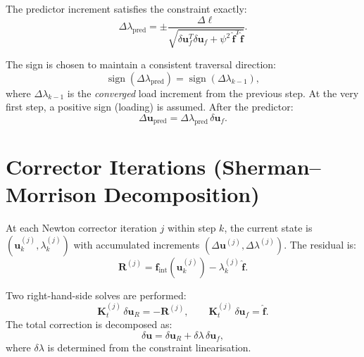 The predictor increment satisfies the constraint exactly:
\begin{equation}
  \label{eq:arc-pred-dl}
  \Delta\lambda_{\text{pred}} = \pm \frac{\Delta\ell}
    {\sqrt{\delta\mathbf{u}_f^T \delta\mathbf{u}_f
           + \psi^2 \,
             \hat{\mathbf{f}}^T \hat{\mathbf{f}}}}.
\end{equation}

The sign is chosen to maintain a consistent traversal direction:
\begin{equation}
  \label{eq:arc-pred-sign}
  \operatorname{sign}(\Delta\lambda_{\text{pred}})
  = \operatorname{sign}(\Delta\lambda_{k-1}),
\end{equation}
where $\Delta\lambda_{k-1}$ is the \emph{converged} load increment from
the previous step.  At the very first step, a positive sign (loading)
is assumed.  After the predictor:
\begin{equation}
  \Delta\mathbf{u}_{\text{pred}} = \Delta\lambda_{\text{pred}} \,
  \delta\mathbf{u}_f.
\end{equation}


\section{Corrector Iterations (Sherman--Morrison Decomposition)}
\label{sec:arc-corrector}

At each Newton corrector iteration $j$ within step $k$, the current
state is $(\mathbf{u}_k^{(j)}, \lambda_k^{(j)})$ with accumulated
increments $(\Delta\mathbf{u}^{(j)}, \Delta\lambda^{(j)})$.  The
residual is:
\begin{equation}
  \mathbf{R}^{(j)} = \mathbf{f}_{\text{int}}(\mathbf{u}_k^{(j)})
  - \lambda_k^{(j)} \, \hat{\mathbf{f}}.
\end{equation}

Two right-hand-side solves are performed:
\begin{equation}
  \label{eq:arc-two-solves}
  \mathbf{K}_t^{(j)} \, \delta\mathbf{u}_R = -\mathbf{R}^{(j)},
  \qquad
  \mathbf{K}_t^{(j)} \, \delta\mathbf{u}_f = \hat{\mathbf{f}}.
\end{equation}
The total correction is decomposed as:
\begin{equation}
  \label{eq:arc-du-decomp}
  \delta\mathbf{u} = \delta\mathbf{u}_R
  + \delta\lambda \, \delta\mathbf{u}_f,
\end{equation}
where $\delta\lambda$ is determined from the constraint linearisation.

